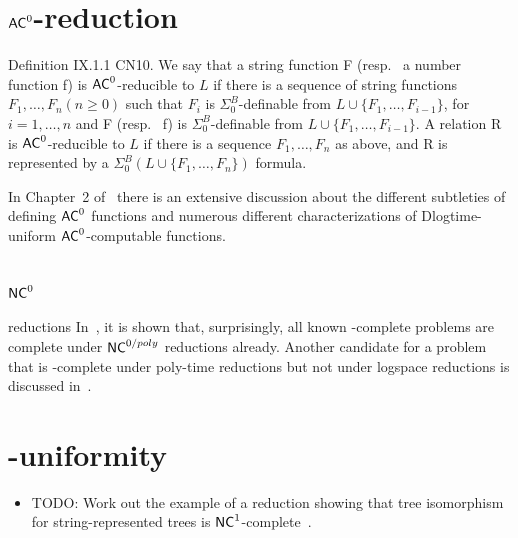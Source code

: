 \section{}
\label{sec:complexity-class-tfnp}

\section{\texorpdfstring{$\mathsf{AC}^{0}$-reduction}{AC\string^0-reduction}}
\label{sec:ac0red}
Definition IX.1.1 CN10. We say that a string function F
(resp. \  a number function f) is $\mathsf{AC}^{0}$-reducible to $L$ if there is a sequence
of string functions $F_1, \dots, F_n (n \geqslant 0)$ such that
$F_i$ is $\Sigma^B_0$-definable from $L \cup \{F_1, \dots , F_{i-1}\}$, for $i = 1, \dots, n$
and F (resp. \ f) is $\Sigma^B_0$-definable from $L \cup \{F_1, \dots , F_{i-1}\}$. A relation R is
$\mathsf{AC}^{0}$-reducible to $L$ if there is a sequence $F_1, \dots, F_n$ as above, and R is
represented by a $\Sigma^B_0(L \cup \{F_1, \dots, F_n\})$ formula.

In Chapter~2 of~\cite{edbd4873718c414f90d22dadf0dba2b1} there is an extensive discussion about
the different subtleties of defining $\mathsf{AC}^{0}$ functions and numerous different characterizations
of Dlogtime-uniform $\mathsf{AC}^{0}$-computable functions.


\section{\texorpdfstring{$\mathsf{NC}^{0}$}{NC\string^0}} reductions
In~\cite{edbd4873718c414f90d22dadf0dba2b1}, it is shown that, surprisingly, all known -complete problems
are complete under $\mathsf{NC}^{0/poly}$ reductions already. Another candidate for a problem that is -complete
under poly-time reductions but not under logspace reductions is discussed in~\cite{18631}.

\section{-uniformity}
\begin{itemize}
\item TODO: Work out the example of a  reduction showing that tree isomorphism for string-represented trees is $\mathsf{NC}^{1}$-complete~\cite{694595}.
\end{itemize}


